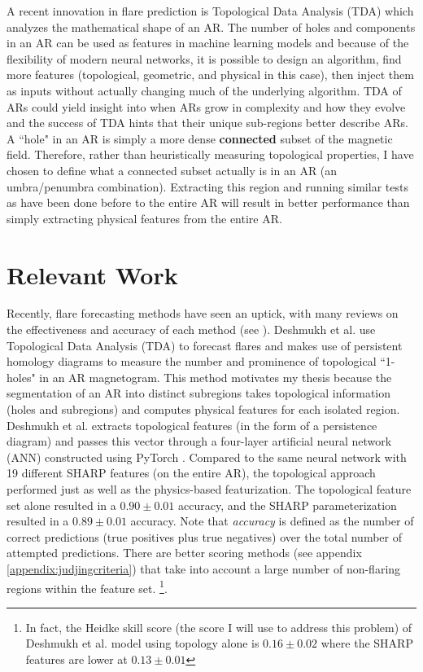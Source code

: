 \documentclass[defaultstyle,11pt]{thesis}
\begin{document}
A recent innovation in flare prediction is Topological Data Analysis (TDA) which analyzes the mathematical shape of an AR. The number of holes and components in an AR can be used as features in machine learning models and because of the flexibility of modern neural networks, it is possible to design an algorithm, find more features (topological, geometric, and physical in this case), then inject them as inputs without actually changing much of the underlying algorithm. TDA of ARs could yield insight into when ARs grow in complexity and how they evolve and the success of TDA hints that their unique sub-regions better describe ARs. A ``hole" in an AR is simply a more dense \textbf{connected} subset of the magnetic field. Therefore, rather than heuristically measuring topological properties, I have chosen to define what a connected subset actually is in an AR (an umbra/penumbra combination). Extracting this region and running similar tests as have been done before to the entire AR will result in better performance than simply extracting physical features from the entire AR. 

\section{Relevant Work}
\label{relevantworkchap}

Recently, flare forecasting methods have seen an uptick, with many reviews on the effectiveness and accuracy of each method (see \cite{Comparison1} \cite{Comparison2} \cite{Comparison3} \cite{Comparison4}). Deshmukh et al. \cite{varad} use Topological Data Analysis (TDA) to forecast flares and makes use of persistent homology diagrams to measure the number and prominence of topological ``1-holes" in an AR magnetogram. This method motivates my thesis because the segmentation of an AR into distinct subregions takes topological information (holes and subregions) and computes physical features for each isolated region. Deshmukh et al. extracts topological features (in the form of a persistence diagram) and passes this vector through a four-layer artificial neural network (ANN) constructed using PyTorch \cite{pytorch}. Compared to the same neural network with 19 different SHARP features (on the entire AR), the topological approach performed just as well as the physics-based featurization. The topological feature set alone resulted in a $0.90 \pm 0.01$ accuracy, and the SHARP parameterization resulted in a $0.89 \pm 0.01$ accuracy. Note that \textit{accuracy} is defined as the number of correct predictions (true positives plus true negatives) over the total number of attempted predictions. There are better scoring methods (see appendix \ref{appendix:judjingcriteria}) that take into account a large number of non-flaring regions within the feature set. \footnote{In fact, the Heidke skill score (the score I will use to address this problem) of Deshmukh et al. model using topology alone is $0.16 \pm 0.02$ where the SHARP features are lower at $0.13 \pm 0.01$}.
\end{document}
